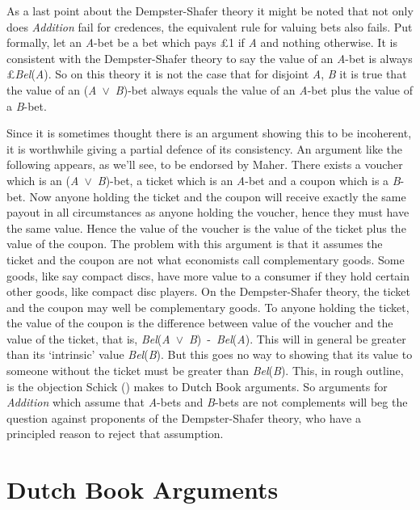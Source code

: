 \documentclass[
  11pt,
  letterpaper,
  DIV=11,
  numbers=noendperiod,
  twoside]{scrartcl}
\begin{document}
As a last point about the Dempster-Shafer theory it might be noted that
not only does \emph{Addition} fail for credences, the equivalent rule
for valuing bets also fails. Put formally, let an \emph{A}-bet be a bet
which pays £1 if \emph{A} and nothing otherwise. It is consistent with
the Dempster-Shafer theory to say the value of an \emph{A}-bet is always
£\emph{Bel}(\emph{A}). So on this theory it is not the case that for
disjoint \emph{A}, \emph{B} it is true that the value of an
(\emph{A}~\({\vee}\)~\emph{B})-bet always equals the value of an
\emph{A}-bet plus the value of a \emph{B}-bet.

Since it is sometimes thought there is an argument showing this to be
incoherent, it is worthwhile giving a partial defence of its
consistency. An argument like the following appears, as we'll see, to be
endorsed by Maher. There exists a voucher which is an
(\emph{A}~\({\vee}\)~\emph{B})-bet, a ticket which is an \emph{A}-bet
and a coupon which is a \emph{B}-bet. Now anyone holding the ticket and
the coupon will receive exactly the same payout in all circumstances as
anyone holding the voucher, hence they must have the same value. Hence
the value of the voucher is the value of the ticket plus the value of
the coupon. The problem with this argument is that it assumes the ticket
and the coupon are not what economists call complementary goods. Some
goods, like say compact discs, have more value to a consumer if they
hold certain other goods, like compact disc players. On the
Dempster-Shafer theory, the ticket and the coupon may well be
complementary goods. To anyone holding the ticket, the value of the
coupon is the difference between value of the voucher and the value of
the ticket, that is,
\emph{Bel}(\emph{A}~\({\vee}\)~\emph{B})~-~\emph{Bel}(\emph{A}). This
will in general be greater than its `intrinsic' value
\emph{Bel}(\emph{B}). But this goes no way to showing that its value to
someone without the ticket must be greater than \emph{Bel}(\emph{B}).
This, in rough outline, is the objection Schick
() makes to Dutch Book arguments. So
arguments for \emph{Addition} which assume that \emph{A}-bets and
\emph{B}-bets are not complements will beg the question against
proponents of the Dempster-Shafer theory, who have a principled reason
to reject that assumption.

\section{Dutch Book Arguments}\label{dutch-book-arguments}
\end{document}
